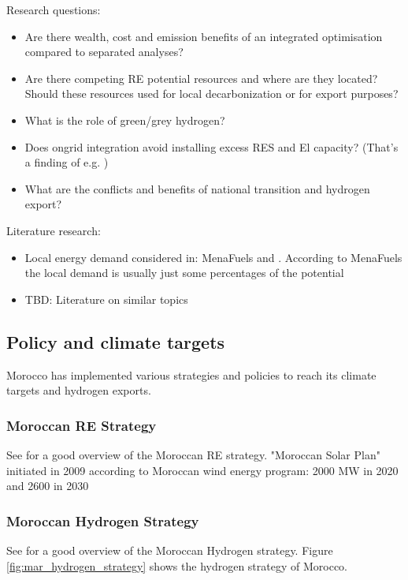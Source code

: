 Research questions:
\begin{itemize}
    \item Are there wealth, cost and emission benefits of an integrated optimisation compared to separated analyses?
    \item Are there competing RE potential resources and where are they located? Should these resources used for local decarbonization or for export purposes?
    \item What is the role of green/grey hydrogen?   
    \item Does ongrid integration avoid installing excess RES and El capacity? (That's a finding of e.g. \cite{Ruhnau2022})
    \item What are the conflicts and benefits of national transition and hydrogen export?
\end{itemize}

Literature research:
\begin{itemize}
    \item Local energy demand considered in: MenaFuels and \cite{Hampp2021}. According to MenaFuels the local demand is usually just some percentages of the potential
    \item TBD: Literature on similar topics 
\end{itemize}


\subsection{Policy and climate targets}
Morocco has implemented various strategies and policies to reach its climate targets and hydrogen exports. 

\subsubsection{Moroccan RE Strategy}
See \cite[p. 13]{Ersoy2022} for a good overview of the Moroccan RE strategy.
"Moroccan Solar Plan" initiated in 2009 according to \cite[p. 2]{Boulakhbar2020}
Moroccan wind energy program: 2000 MW in 2020 and 2600 in 2030 \cite[p. 4]{Boulakhbar2020}

\subsubsection{Moroccan Hydrogen Strategy}
See \cite[p. 14]{Ersoy2022} for a good overview of the Moroccan Hydrogen strategy. Figure \ref{fig:mar_hydrogen_strategy} shows the hydrogen strategy of Morocco.

